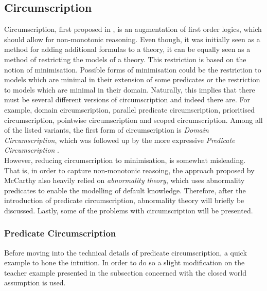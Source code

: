 \documentclass{article}
\begin{document}
\subsection{Circumscription}
Circumscription, first proposed in \cite{mccarthy1981circumscription}, is an augmentation of first order logics, which should allow for non-monotonic reasoning. Even though, it was initially seen as a method for adding additional formulas to a theory, it can be equally seen as a method of restricting the models of a theory. This restriction is based on the notion of minimisation. Possible forms of minimisation could be the restriction to models which are minimal in their extension of some predicates or the restriction to models which are minimal in their domain. Naturally, this implies that there must be several different versions of circumscription and indeed there are. For example, domain circumscription, parallel predicate circumscription, prioritised circumscription, pointwise circumscription and scoped circumscription. Among all of the listed variants, the first form of circumscription is \emph{Domain Circumscription}, which was followed up by the more expressive \emph{Predicate Circumscription} \cite{BOCHMAN2007557, brewka1997nonmonotonic}. \\

However, reducing circumscription to minimisation, is somewhat misleading. That is, in order to capture non-monotonic reasoing, the approach proposed by McCarthy also heavily relied on \emph{abnormality theory}, which uses abnormality predicates to enable the modelling of default knowledge. Therefore, after the introduction of predicate circumscription, abnormality theory will briefly be discussed.  \cite{BOCHMAN2007557} 
Lastly, some of the problems with circumscription will be presented.



\subsubsection{Predicate Circumscription}
Before moving into the technical details of predicate circumscription, a quick example to hone the intuition. In order to do so a slight modification on the teacher example presented in the subsection concerned with the closed world assumption is used. \\
\end{document}
